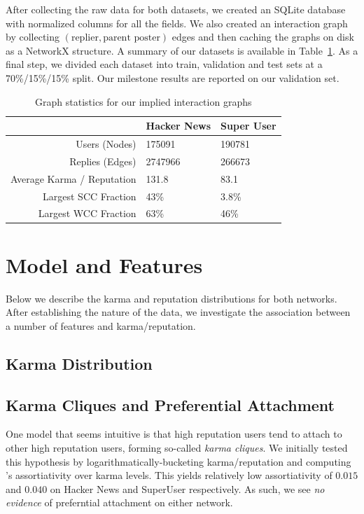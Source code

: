 \documentclass[11pt]{article}
\begin{document}
After collecting the raw data for both datasets, we created an SQLite database
with normalized columns for all the fields. We also created an interaction graph
by collecting $(\text{replier}, \text{parent poster})$ edges and then caching
the graphs on disk as a NetworkX structure. A summary of our datasets is
available in Table~\ref{tab:graphstats}. As a final step, we divided each dataset 
into train, validation and test sets at
a 70\%/15\%/15\% split. Our milestone results are reported on our validation
set.

\begin{table}[t]
\begin{center}
\begin{tabular}{| r | l l |}
\hline
& \textbf{Hacker News} & \textbf{Super User} \\
\hline
Users (Nodes) & 175091 & 190781 \\
Replies (Edges) & 2747966 & 266673 \\
Average Karma / Reputation & 131.8 & 83.1 \\
Largest SCC Fraction & 43\% & 3.8\% \\
Largest WCC Fraction & 63\% & 46\% \\
\hline
\end{tabular}
\end{center}
\caption{Graph statistics for our implied interaction graphs}
\label{tab:graphstats}
\end{table}

\section{Model and Features}
Below we describe the karma and reputation distributions for both networks.
After establishing the nature of the data, we investigate the association 
between a number of features and karma/reputation. 

\subsection{Karma Distribution}

\subsection{Karma Cliques and Preferential Attachment}
One model that seems intuitive is that high reputation users
tend to attach to other high reputation users, forming so-called
\textit{karma cliques}. We initially tested this hypothesis by
logarithmatically-bucketing karma/reputation and computing 
\citet{newman2003mixing}'s assortiativity over karma levels. This yields
relatively low assortiativity of $0.015$ and $0.040$ on Hacker News
and SuperUser respectively. As such, we see \textit{no evidence} of 
preferntial attachment on either network.
\end{document}
